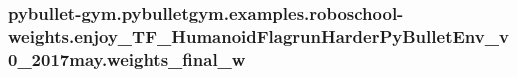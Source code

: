 \subsubsection[{\texorpdfstring{weights\+\_\+final\+\_\+w}{weights_final_w}}]{\setlength{\rightskip}{0pt plus 5cm}pybullet-\/gym.\+pybulletgym.\+examples.\+roboschool-\/weights.\+enjoy\+\_\+\+T\+F\+\_\+\+Humanoid\+Flagrun\+Harder\+Py\+Bullet\+Env\+\_\+v0\+\_\+2017may.\+weights\+\_\+final\+\_\+w}\hypertarget{namespacepybullet-gym_1_1pybulletgym_1_1examples_1_1roboschool-weights_1_1enjoy___t_f___humanoid6cf5bb1cece630011749e55e6e33a106_afe8f0716afae9eed60580b26de3535f5}{}\label{namespacepybullet-gym_1_1pybulletgym_1_1examples_1_1roboschool-weights_1_1enjoy___t_f___humanoid6cf5bb1cece630011749e55e6e33a106_afe8f0716afae9eed60580b26de3535f5}
